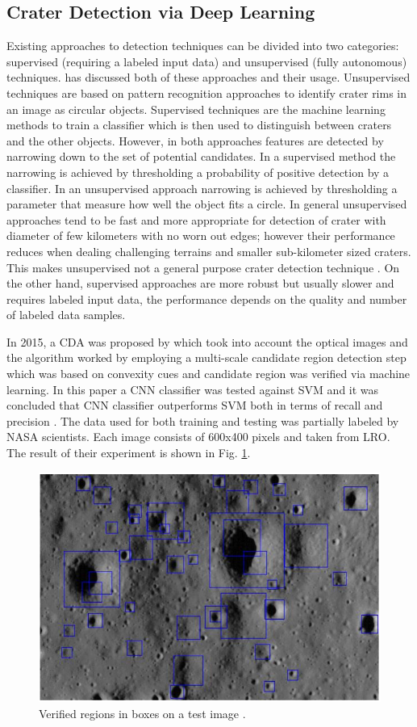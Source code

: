 \documentclass[11pt]{article}
\begin{document}
\subsection{Crater Detection via Deep Learning}
Existing approaches to detection techniques can be divided into two categories: supervised (requiring a labeled input data) and unsupervised (fully autonomous) techniques. \cite{stepinski2009machine} has discussed both of these approaches and their usage. Unsupervised techniques are based on pattern recognition approaches to identify crater rims in an image as circular objects. Supervised techniques are the machine learning methods to train a classifier which is then used to distinguish between craters and the other objects. However, in both approaches features are detected by narrowing down to the set of potential candidates. In a supervised method the narrowing is achieved by thresholding a probability of positive detection by a classifier. In an unsupervised approach narrowing is achieved by thresholding a parameter that measure how well the object fits a circle. In general unsupervised approaches tend to be fast and more appropriate for detection of crater with diameter of few kilometers with no worn out edges; however their performance reduces when dealing challenging terrains and smaller sub-kilometer sized craters. This makes unsupervised not a general purpose crater detection technique \cite{emami2015automatic}. On the other hand, supervised approaches are more robust but usually slower and requires labeled input data, the performance depends on the quality and number of labeled data samples.

In 2015, a CDA was proposed by \cite{emami2015automatic} which took into account the optical images and the algorithm worked by employing a multi-scale candidate region detection step which was based on convexity cues and candidate region was verified via machine learning. In this paper a CNN classifier was tested against SVM and it was concluded that CNN classifier outperforms SVM both in terms of recall and precision \cite{emami2015automatic}. The data used for both training and testing was partially labeled by NASA scientists. Each image consists of 600x400 pixels and taken from LRO. The result of their experiment is shown in Fig. \ref{cnn_class}.

\begin{figure}[ht!]
	\centering
	\includegraphics[width=.6\textwidth]{files/literature/emami.png}
	\caption{Verified regions in boxes on a test image \cite{wetzler2005learning}.}
	\label{cnn_class}
\end{figure}
\end{document}
